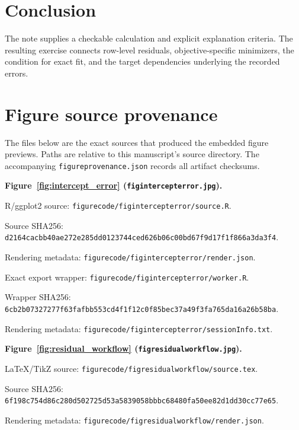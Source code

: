 \documentclass[11pt]{article}
\begin{document}
\section{Conclusion}

The note supplies a checkable calculation and explicit explanation
criteria. The resulting exercise connects row-level residuals,
objective-specific minimizers, the condition for exact fit, and
the target dependencies underlying the recorded errors.

\clearpage
\section*{Figure source provenance}
The files below are the exact sources that produced the embedded figure previews. Paths are relative to this manuscript's source directory. The accompanying \texttt{figureprovenance.json} records all artifact checksums.\par
\medskip\noindent\textbf{Figure~\ref{fig:intercept_error} (\texttt{figintercepterror.jpg}).}\par
\noindent R/ggplot2 source: \texttt{figurecode/\allowbreak{}figintercepterror/\allowbreak{}source.R}.\par
\noindent Source SHA256: \texttt{d2164cac\allowbreak{}bb40ae27\allowbreak{}2e285dd0\allowbreak{}123744ce\allowbreak{}d626b06c\allowbreak{}00bd67f9\allowbreak{}d17f1f86\allowbreak{}6a3da3f4}.\par
\noindent Rendering metadata: \texttt{figurecode/\allowbreak{}figintercepterror/\allowbreak{}render.json}.\par
\noindent Exact export wrapper: \texttt{figurecode/\allowbreak{}figintercepterror/\allowbreak{}worker.R}.\par
\noindent Wrapper SHA256: \texttt{6cb2b073\allowbreak{}27277f63\allowbreak{}fafbb553\allowbreak{}cd4f1f12\allowbreak{}c0f85bec\allowbreak{}37a49f3f\allowbreak{}a765da16\allowbreak{}a26b58ba}.\par
\noindent Rendering metadata: \texttt{figurecode/\allowbreak{}figintercepterror/\allowbreak{}sessionInfo.txt}.\par
\medskip\noindent\textbf{Figure~\ref{fig:residual_workflow} (\texttt{figresidualworkflow.jpg}).}\par
\noindent LaTeX/TikZ source: \texttt{figurecode/\allowbreak{}figresidualworkflow/\allowbreak{}source.tex}.\par
\noindent Source SHA256: \texttt{6f198c75\allowbreak{}4d86c280\allowbreak{}d502725d\allowbreak{}53a58390\allowbreak{}58bbbc68\allowbreak{}480fa50e\allowbreak{}e82d1dd3\allowbreak{}0cc77e65}.\par
\noindent Rendering metadata: \texttt{figurecode/\allowbreak{}figresidualworkflow/\allowbreak{}render.json}.\par
\end{document}

